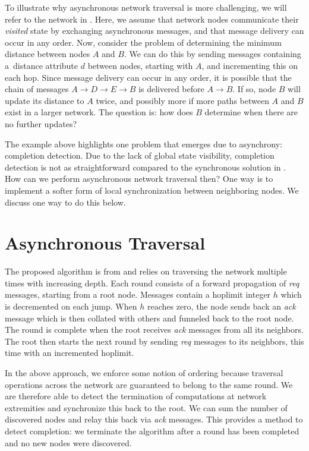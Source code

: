\documentclass[conference]{IEEEtran}
\begin{document}
To illustrate why asynchronous network traversal is more challenging, we will
refer to the network in . Here, we assume that network nodes
communicate their \emph{visited} state by exchanging asynchronous messages,
and that message delivery can occur in any order. Now, consider the problem of
determining the minimum distance between nodes $A$ and $B$. We can do this by
sending messages containing a~distance attribute $d$ between nodes, starting
with $A$, and incrementing this on each hop. Since message delivery can occur
in any order, it is possible that the chain of messages $A \rightarrow D
\rightarrow E \rightarrow B$ is delivered before $A \rightarrow B$. If so,
node $B$ will update its distance to $A$ twice, and possibly more if more
paths between $A$ and $B$ exist in a larger network. The question is: how does
$B$ determine when there are no further updates?

The example above highlights one problem that emerges due to asynchrony:
completion detection. Due to the lack of global state visibility, completion
detection is not as straightforward compared to the synchronous solution in
. How can we perform asynchronous network traversal then? One
way is to implement a softer form of local synchronization between neighboring
nodes. We discuss one way to do this below.



\section{Asynchronous Traversal}
\label{sec_async}

The proposed algorithm is from \cite{lynch1996distributed} and relies on
traversing the network multiple times with increasing depth. Each round
consists of a forward propagation of \emph{req} messages, starting from a root
node. Messages contain a hoplimit integer $h$ which is decremented on each
jump. When $h$ reaches zero, the node sends back an \emph{ack} message which
is then collated with others and funneled back to the root node. The round is
complete when the root receives \emph{ack} messages from all its neighbors.
The root then starts the next round by sending \emph{req} messages to its
neighbors, this time with an incremented hoplimit.

In the above approach, we enforce some notion of ordering because traversal
operations across the network are guaranteed to belong to the same round. We
are therefore able to detect the termination of computations at network
extremities and synchronize this back to the root. We can sum the number of
discovered nodes and relay this back via \emph{ack} messages. This provides a
method to detect completion: we terminate the algorithm after a round has been
completed and no new nodes were discovered.
\end{document}
